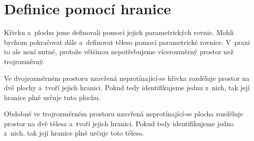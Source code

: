 \section{Definice pomocí hranice}

Křivku a~plochu jsme definovali pomocí jejich parametrických rovnic. Mohli bychom pokračovat dále a~definovat těleso pomocí parametrické rovnice. V~praxi to ale není nutné, protože většinou nepotřebujeme vícerozměrný prostor než trojrozměrný.

Ve dvojrozměrném prostoru uzavřená neprotínající-se křivka rozděluje prostor na dvě plochy a~tvoří jejich hranici. Pokud tedy identifikujeme jednu z~nich, tak její hranice plně určuje tuto plochu. 

Obdobně ve trojrozměrném prostoru uzavřená neprotínající-se plocha rozděluje prostor na dvě tělesa a~tvoří jejich hranici. Pokud tedy identifikujeme jedno z~nich, tak její hranice plně určuje toto těleso.
